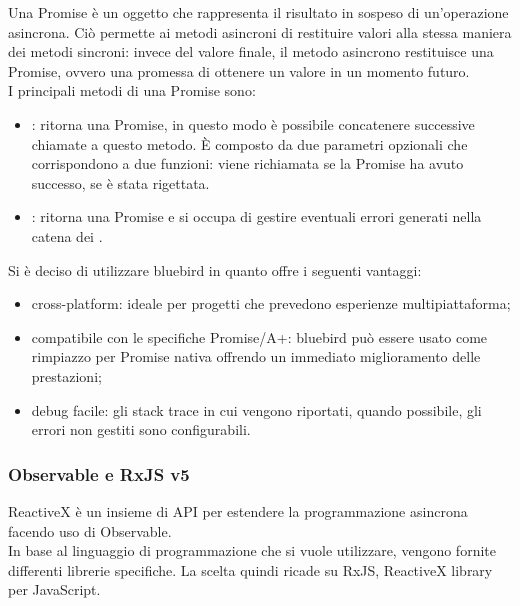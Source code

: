 Una Promise è un oggetto che rappresenta il risultato in sospeso di un’operazione asincrona. Ciò permette ai metodi asincroni di restituire valori alla stessa maniera dei metodi sincroni:
invece del valore finale, il metodo asincrono restituisce una Promise, ovvero una promessa di ottenere un valore in un momento futuro. \\
I principali metodi di una Promise sono:

\begin{itemize}

\item {}: ritorna una Promise, in questo modo è possibile concatenere successive chiamate a questo metodo. È composto da due parametri opzionali che corrispondono a
due funzioni:  viene richiamata se la Promise ha avuto successo,  se è stata rigettata.

\item {}: ritorna una Promise e si occupa di gestire eventuali errori generati nella catena dei .

\end{itemize}
Si è deciso di utilizzare bluebird in quanto offre i seguenti vantaggi:

\begin{itemize}

\item cross-platform: ideale per progetti che prevedono esperienze multipiattaforma;

\item compatibile con le specifiche Promise/A+: bluebird può essere usato come rimpiazzo per Promise nativa offrendo un immediato miglioramento delle prestazioni;

\item debug facile: gli stack trace in cui vengono riportati, quando possibile, gli errori non gestiti sono configurabili.

\end{itemize}

\newpage
\subsubsection{Observable e RxJS v5}
ReactiveX è un insieme di API per estendere la programmazione asincrona facendo uso di Observable.\\
In base al linguaggio di programmazione che si vuole utilizzare, vengono fornite differenti librerie specifiche.
La scelta quindi ricade su RxJS, ReactiveX library per JavaScript.


